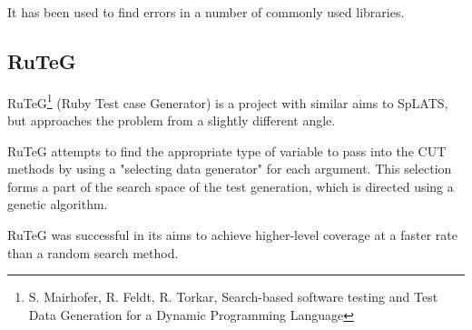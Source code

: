     It has been used to find errors in a number of commonly used libraries.

  \subsection{RuTeG}
    RuTeG\footnote{S. Mairhofer, R. Feldt, R. Torkar, Search-based software
testing and Test Data Generation for a Dynamic Programming Language} (Ruby Test
case Generator) is a project with similar aims to SpLATS, but approaches the
problem from a slightly different angle.

RuTeG attempts to find the appropriate type of variable to pass into the CUT
methods by using a "selecting data generator" for each argument. This selection
forms a part of the search space of the test generation, which is directed using
a genetic algorithm.

RuTeG was successful in its aims to achieve higher-level coverage at a faster
rate than a random search method.
